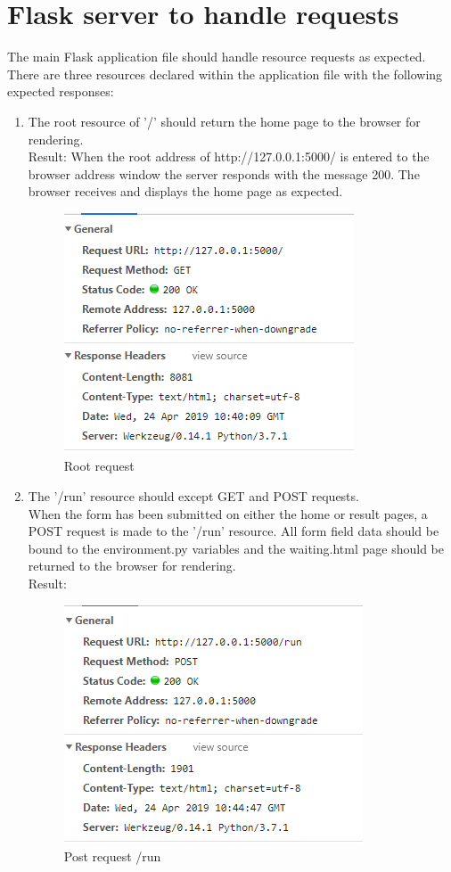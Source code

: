 \section{Flask server to handle requests}
The main Flask application file should handle resource requests as expected.\\
There are three resources declared within the application file with the following expected responses:
\begin{enumerate}
	\item The root resource of '/' should return the home page to the browser for rendering.\\
	 Result: When the root address of http://127.0.0.1:5000/ is entered to the browser address window the server responds with the message 200. The browser receives and displays the home page as expected.
	\begin{figure}[H]
		\centering
		\includegraphics[width=0.7\linewidth]{img/RootReq}
		\caption{Root request}
		\label{fig:rootreq}
	\end{figure}
	
	\item The '/run' resource should except GET and POST requests.\\
	When the form has been submitted on either the home or result pages, a POST request is made to the '/run' resource. All form field data should be bound to the environment.py variables and the waiting.html page should be returned to the browser for rendering.\\
	Result:
	\begin{figure}[H]
		\centering
		\includegraphics[width=0.7\linewidth]{img/RunResource}
		\caption{Post request /run}
		\label{fig:runresource}
	\end{figure}
	

\end{enumerate}
